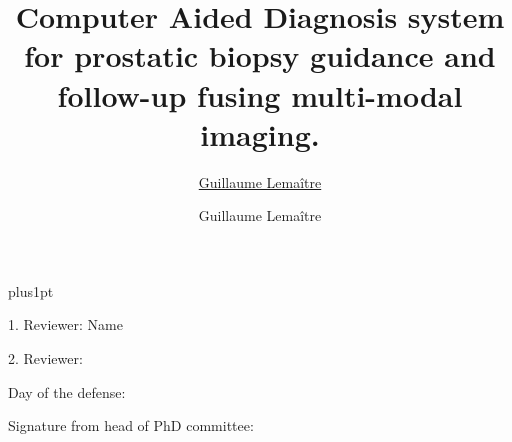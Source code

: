 \documentclass[twoside,11pt]{Latex/Classes/PhDthesisPSnPDF}
\title{Computer Aided Diagnosis system for prostatic biopsy guidance and follow-up fusing multi-modal imaging.
}
\author{\href{mailto:guillaume.lemaitre@udg.edu}{Guillaume Lema\^itre}}
\author{Guillaume Lema\^itre}
\begin{document}

\renewcommand\baselinestretch{1.2}
\baselineskip=18pt plus1pt



\maketitle  %



\newpage
\vspace{10mm}
1. Reviewer: Name

\vspace{10mm}
2. Reviewer: 

\vspace{20mm}
Day of the defense:

\vspace{20mm}
\hspace{70mm}Signature from head of PhD committee:







%  



\frontmatter





\setcounter{secnumdepth}{3} %
\setcounter{tocdepth}{3}    %
\tableofcontents            %
\clearpage
\end{document}
